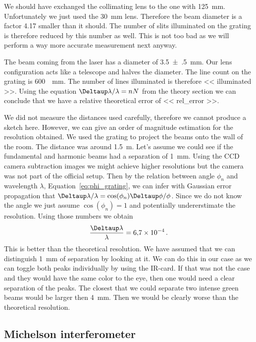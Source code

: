 \documentclass[11pt, english, fleqn, DIV=15, headinclude, BCOR=2cm]{scrreprt}
\begin{document}
We should have exchanged the collimating lens to the one with
\SI{125}{\milli\meter}. Unfortunately we just used the \SI{30}{\milli\meter}
lens. Therefore the beam diameter is a factor \num{4.17} smaller than it
should. The number of slits illuminated on the grating is therefore reduced by
this number as well. This is not too bad as we will perform a way more accurate
measurement next anyway.

The beam coming from the laser has a diameter of \SI{3.5(5)}{\milli\meter}.
Our lens configuration acts like a telescope and halves the diameter. The
line count on the grating is \SI{600}{\per\milli\meter}. The number of lines
illuminated is therefore \num{<< illuminated >>}. Using the equation $\Deltaup
\lambda / \lambda = nN$ from the theory section we can conclude that we have a
relative theoretical error of \num{<< rel_error >>}.

We did not measure the distances used carefully, therefore we cannot produce a
sketch here. However, we can give an order of magnitude estimation for the
resolution obtained. We used the grating to project the beams onto the wall of
the room. The distance was around \SI{1.5}{\meter}. Let's assume we could see
if the fundamental and harmonic beams had a separation of \SI{1}{\milli\meter}.
Using the CCD camera subtraction images we might achieve higher resolutions but
the camera was not part of the official setup. Then by the relation between
angle $\phi_n$ and wavelength $\lambda$, Equation~\eqref{eq:phi_grating}, we
can infer with Gaussian error propagation that $\Deltaup \lambda / \lambda =
\cos(\phi_n) \Deltaup \phi / \phi$. Since we do not know the angle we just
assume $\cos(\phi_n) = 1$ and potentially undererstimate the resolution. Using
those numbers we obtain
\[
    \frac{\Deltaup \lambda}{\lambda} = \num{6.7e-4} \,.
\]
This is better than the theoretical resolution. We have assumed that we can
distinguish \SI{1}{\milli\meter} of separation by looking at it. We can do this
in our case as we can toggle both peaks individually by using the IR-card. If
that was not the case and they would have the same color to the eye, then one
would need a clear separation of the peaks. The closest that we could separate
two intense green beams would be larger then \SI{4}{\milli\meter}. Then we
would be clearly worse than the theoretical resolution.

\subsection{Michelson interferometer}
\end{document}
